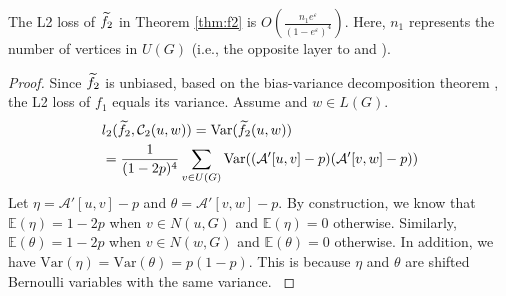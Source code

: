 \begin{theorem}
\label{thm:f2.var}
{\color{black}
The L2 loss of $\widetilde{f}_2$ in Theorem \ref{thm:f2} is $O(\frac{ n_1  e^{\varepsilon}}{(1 - e^{\varepsilon})^4} )$. Here, $n_1$ represents the number of vertices in $U(G)$ (i.e., the opposite layer to \vq and \vx). }
\end{theorem}
\begin{proof}

Since $\widetilde{f}_2$ is unbiased, based on the bias-variance decomposition theorem \cite{bouckaert2008practical}, the L2 loss of $f_1$ equals its variance. 
{\color{black}Assume \vq and $w \in L(G)$. }
\begin{align*}
    & l_2( \widetilde{f}_2,  \mathcal{C}_2(u,w) ) = \mathrm{Var}( \widetilde{f}_2(u,w))  \\
    & = {\color{black}\frac{1}{(1-2p)^4} \sum_{   v \in U(G)}  \mathrm{Var}( (\mathcal{A}'[u,v] - p) (\mathcal{A}'[v,w] - p ) ) }\\
\end{align*}
{\color{black}Let \(\eta = \mathcal{A}'[u,v] - p\) and \(\theta = \mathcal{A}'[v,w] - p\). 
By construction, we know that \(\mathbb{E}(\eta) = 1 - 2p\) when \(v \in N(u, G)\) and \(\mathbb{E}(\eta) = 0\) otherwise. 
Similarly, \(\mathbb{E}(\theta) = 1 - 2p\) when \(v \in N(w, G)\) and \(\mathbb{E}(\theta) = 0\) otherwise. 
In addition, we have \(\mathrm{Var}(\eta) = \mathrm{Var}(\theta) = p(1 - p)\). 
This is because \(\eta\) and \(\theta\) are shifted Bernoulli variables with the same variance. }


\end{proof}
